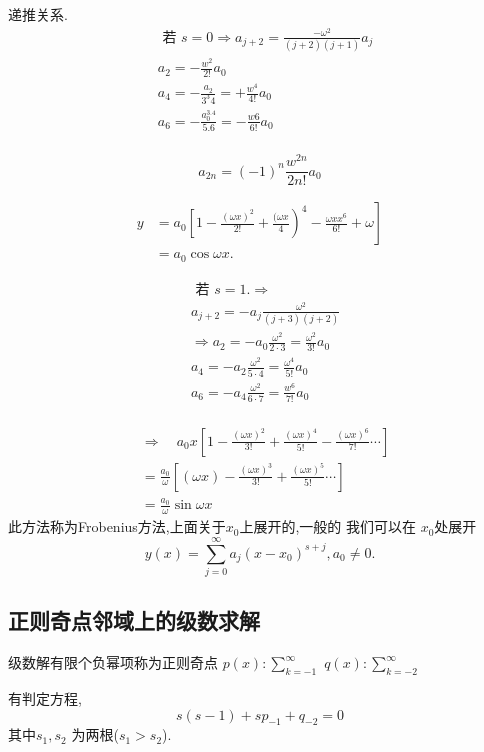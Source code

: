 递推关系.
$$
\begin{aligned}
& \text { 若 } s=0 \Rightarrow a_{j+2}=\frac{-\omega^2}{(j+2)(j+1)} a_j \\
& a_2=-\frac{w^2}{2 !} a_0 \\
& a_4=-\frac{a_2}{3^3 4}=+\frac{w^4}{4 !} a_0 \\
& a_6=-\frac{a_0^{3.4}}{5.6}=-\frac{w 6}{6 !} a_0 \\
&
\end{aligned}
$$

$$
a_{2 n}=(-1)^n \frac{w^{2 n}}{2 n !} a_0
$$

$$
\begin{aligned}
y & \left.=a_0\left[1-\frac{(\omega x)^2}{2 !}+\frac{(\omega x}{4}\right)^4-\frac{\omega x x^6}{6 !}+\omega\right] \\
& =a_0 \cos \omega x .
\end{aligned}
$$

$$
\begin{aligned}
& \text { 若 } s=1 . \Rightarrow \\
& a_{j+2}=-a_j \frac{\omega^2}{(j+3) (j+2)} \\
& \Rightarrow a_2=-a_0 \frac{\omega^2}{2 \cdot 3}=\frac{\omega^2}{3 !} a_0 \\
& a_4=-a_2 \frac{\omega^2}{5 \cdot 4}=\frac{\omega^4}{5 !} a_0 \\
& a_6=-a_4 \frac{\omega^2}{6\cdot 7}=\frac{w^6}{7 !} a_0 \\
\end{aligned}
$$

$$
\begin{aligned}
& \Rightarrow \quad a_0 x\left[1-\frac{(\omega x)^2}{3 !}+\frac{(\omega x)^{4}}{5 !}-\frac{(\omega x)^6}{7 !} \cdots\right] \\
& =\frac{a_0}{\omega}\left[(\omega x)-\frac{(\omega x)^3}{3 !}+\frac{(\omega x)^5}{5 !} \cdots\right] \\
& =\frac{a_0}{\omega} \sin \omega x
\end{aligned}
$$
此方法称为Frobenius方法,上面关于$x_0$上展开的,一般的
我们可以在 $x_0$处展开
$$
y(x)=\sum_{j=0}^{\infty} a_j\left(x-x_0\right)^{s+j}, a_0 \neq 0 .
$$


\subsection{正则奇点邻域上的级数求解}
级数解有限个负幂项称为正则奇点 $p(x): \sum_{k=-1}^{\infty}$
$q(x) : \sum_{k=-2}^{\infty}$

有判定方程,
$$
s(s-1)+s p_{-1}+q_{-2}=0
$$
其中$s_1, s_2$ 为两根($s_1> s_2$).

